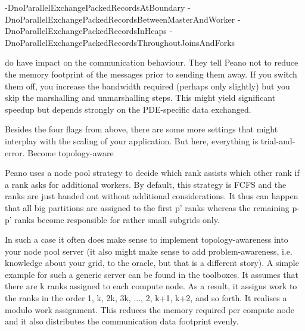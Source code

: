 -DnoParallelExchangePackedRecordsAtBoundary
-DnoParallelExchangePackedRecordsBetweenMasterAndWorker
-DnoParallelExchangePackedRecordsInHeaps
-DnoParallelExchangePackedRecordsThroughoutJoinsAndForks

do have impact on the communication behaviour. They tell Peano not to reduce the memory footprint of the messages prior to sending them away. If you switch them off, you increase the bandwidth required (perhaps only slightly) but you skip the marshalling and unmarshalling steps. This might yield significant speedup but depends strongly on the PDE-specific data exchanged.

Besides the four flags from above, there are some more settings that might interplay with the scaling of your application. But here, everything is trial-and-error.
Become topology-aware

Peano uses a node pool strategy to decide which rank assists which other rank if a rank asks for additional workers. By default, this strategy is FCFS and the ranks are just handed out without additional considerations. It thus can happen that all big partitions are assigned to the first p' ranks whereas the remaining p-p' ranks become responsible for rather small subgrids only.

In such a case it often does make sense to implement topology-awareness into your node pool server (it also might make sense to add problem-awareness, i.e. knowledge about your grid, to the oracle, but that is a different story). A simple example for such a generic server can be found in the toolboxes. It assumes that there are k ranks assigned to each compute node. As a result, it assigns work to the ranks in the order 1, k, 2k, 3k, ..., 2, k+1, k+2, and so forth. It realises a modulo work assignment. This reduces the memory required per compute node and it also distributes the communication data footprint evenly.   

